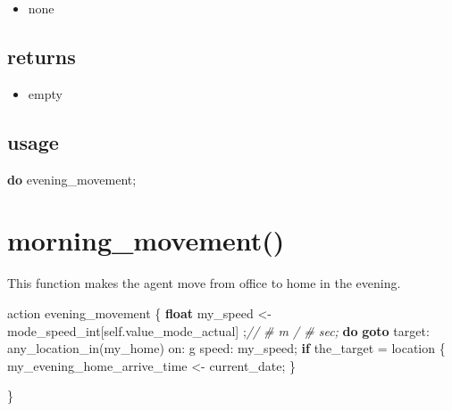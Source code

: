\documentclass[]{book}
\newenvironment{Shaded}{\begin{snugshade}}{\end{snugshade}}
\newcommand{\CommentTok}[1]{\textcolor[rgb]{0.56,0.35,0.01}{\textit{#1}}}
\newcommand{\KeywordTok}[1]{\textcolor[rgb]{0.13,0.29,0.53}{\textbf{#1}}}
\newcommand{\NormalTok}[1]{#1}
\newcommand{\OtherTok}[1]{\textcolor[rgb]{0.56,0.35,0.01}{#1}}
\providecommand{\tightlist}{%
  \setlength{\itemsep}{0pt}\setlength{\parskip}{0pt}}
\theoremstyle{definition}
\theoremstyle{definition}
\theoremstyle{definition}
\theoremstyle{remark}
\begin{document}
\begin{itemize}
\tightlist
\item
  none
\end{itemize}

\hypertarget{returns-1}{%
\subsection*{returns}\label{returns-1}}

\begin{itemize}
\tightlist
\item
  empty
\end{itemize}

\hypertarget{usage-1}{%
\subsection*{usage}\label{usage-1}}

\begin{Shaded}
\begin{Highlighting}[]

\KeywordTok{do}\NormalTok{ evening_movement}\OtherTok{;}
\end{Highlighting}
\end{Shaded}

\hypertarget{morning_movement}{%
\section{morning\_movement()}\label{morning_movement}}

This function makes the agent move from office to home in the evening.

\begin{Shaded}
\begin{Highlighting}[]
\NormalTok{action evening_movement}
\NormalTok{    \{}
        \KeywordTok{float}\NormalTok{ my_speed <- mode_speed_int}\OtherTok{[}\NormalTok{self.value_mode_actual}\OtherTok{]} \OtherTok{;}\CommentTok{// # m / # sec;}
        \KeywordTok{do} \KeywordTok{goto}\NormalTok{ target: any_location_in}\OtherTok{(}\NormalTok{my_home}\OtherTok{)}\NormalTok{ on: g speed: my_speed}\OtherTok{;}
        \KeywordTok{if}\NormalTok{ the_target = location}
\NormalTok{        \{}
\NormalTok{            my_evening_home_arrive_time <- current_date}\OtherTok{;}
\NormalTok{        \}}

\NormalTok{    \}}
\end{Highlighting}
\end{Shaded}
\end{document}

